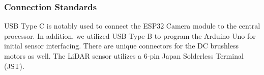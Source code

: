 \subsubsection{Connection Standards}
\noindent USB Type C is notably used to connect the ESP32 Camera module to the central processor. In addition, we utilized USB Type B to program the Arduino Uno for initial sensor interfacing. There are unique connectors for the DC brushless motors as well. The LiDAR sensor utilizes a 6-pin Japan Solderless Terminal (JST).

